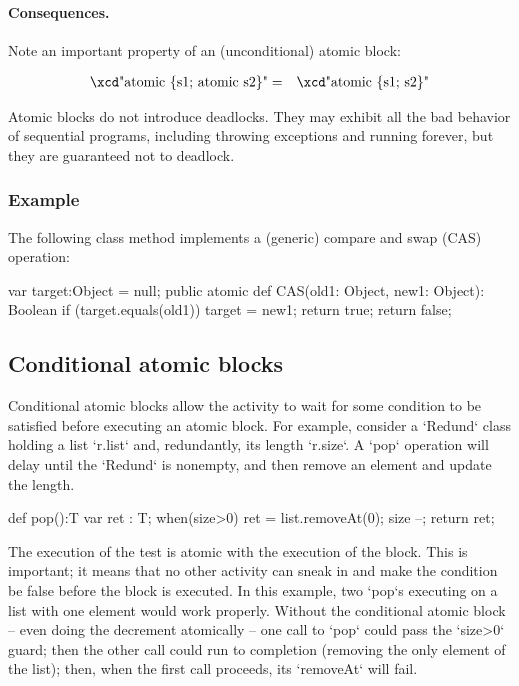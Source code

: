 \paragraph{Consequences.}
Note an important property of an (unconditional) atomic block:

\begin{eqnarray}
 \mbox{\xcd"atomic \{s1; atomic s2\}"} &=& \mbox{\xcd"atomic \{s1; s2\}"}
\end{eqnarray}

Atomic blocks do not introduce deadlocks.    They may exhibit all the bad
behavior of sequential programs, including throwing exceptions and running
forever, but they are guaranteed not to deadlock.


\subsubsection{Example}

The following class method implements a (generic) compare and swap (CAS) operation:


\begin{xten}
var target:Object = null;
public atomic def CAS(old1: Object, new1: Object): Boolean {
   if (target.equals(old1)) {
     target = new1;
     return true;
   }
   return false;
}
\end{xten}

\subsection{Conditional atomic blocks}

Conditional atomic blocks allow the activity to wait for some condition to be
satisfied before executing an atomic block. For example, consider a
\xcd`Redund` class holding a list \xcd`r.list` and, redundantly, its length
\xcd`r.size`.  A \xcd`pop` operation will delay until the \xcd`Redund` is
nonempty, and then remove an element and update the length.  
\begin{xten}
def pop():T {
  var ret : T;
  when(size>0) {
    ret = list.removeAt(0);
    size --;
    }
  return ret;
}
\end{xten}


The execution of the test is atomic with the execution of the block.  This is
important; it means that no other activity can sneak in and make the condition
be false before the block is executed.  In this example, two \xcd`pop`s
executing on a list with one element would work properly. Without the
conditional atomic block -- even doing the decrement atomically -- one call to
\xcd`pop` could pass the \xcd`size>0` guard; then the other call could run to
completion (removing the only element of the list); then, when the first call
proceeds, its \xcd`removeAt` will fail.  

